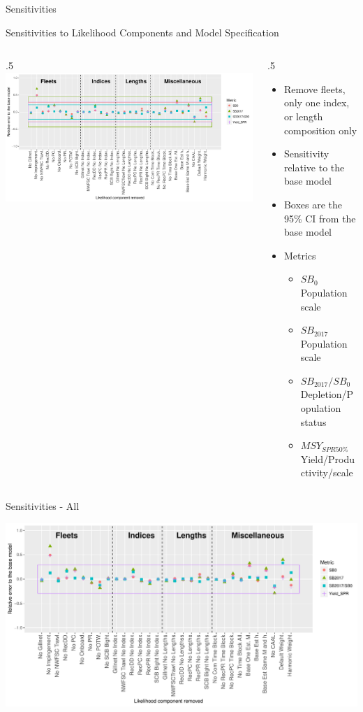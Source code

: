 \documentclass[ignorenonframetext,]{beamer}
\def\begincols{\begin{columns}}
\def\begincol{\begin{column}}
\def\endcol{\end{column}}
\def\endcols{\end{columns}}
\begin{document}
\begin{frame}{Sensitivities}

Sensitivities to Likelihood Components and Model Specification
\begincols
 \begincol{.5\textwidth} \includegraphics{Figures/Sensitivity_All.pdf}
\endcol
 \begincol{.5\textwidth}

\begin{itemize}
\item Remove fleets, only one index, or length composition only
\item Sensitivity relative to the base model
\item Boxes are the 95\% CI from the base model
\item Metrics
\begin{itemize}
\item $SB_0$ Population scale
\item $SB_{2017}$ Population scale
\item $SB_{2017}/SB_{0}$ Depletion/Population status
\item $MSY_{SPR50\%}$ Yield/Productivity/scale
\end{itemize}
\end{itemize}

\endcol
\endcols

\end{frame}

\begin{frame}{Sensitivities - All}

\includegraphics{Figures/Sensitivity_Yield.pdf}

\end{frame}
\end{document}
